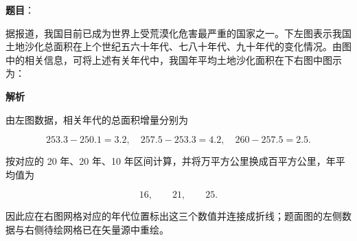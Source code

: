 \begin{answer}

\textbf{题目}：

据报道，我国目前已成为世界上受荒漠化危害最严重的国家之一。下左图表示我国土地沙化总面积在上个世纪五六十年代、七八十年代、九十年代的变化情况。由图中的相关信息，可将上述有关年代中，我国年平均土地沙化面积在下右图中图示为：
\nopagebreak[4]
\begin{center}\end{center}
\nopagebreak[4]
\textbf{解析}

由左图数据，相关年代的总面积增量分别为

\nopagebreak[4]
\[
253.3-250.1=3.2,\quad
257.5-253.3=4.2,\quad
260-257.5=2.5.
\]

按对应的 20 年、20 年、10 年区间计算，并将万平方公里换成百平方公里，年平均值为

\nopagebreak[4]
\[
16,\qquad 21,\qquad 25.
\]

因此应在右图网格对应的年代位置标出这三个数值并连接成折线；题面图的左侧数据与右侧待绘网格已在矢量源中重绘。


\end{answer}

